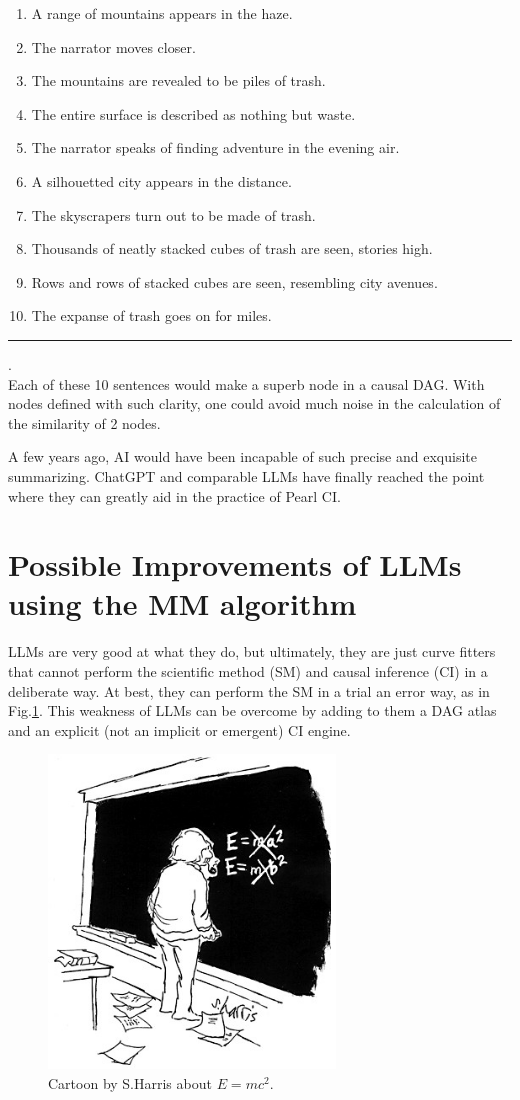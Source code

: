 \documentclass[12pt]{article}
\begin{document}
\begin{enumerate}
\item A range of mountains appears in the haze.
\item The narrator moves closer.
\item The mountains are revealed to be piles of trash.
\item The entire surface is described as nothing but waste.
\item The narrator speaks of finding adventure in the evening air.
\item A silhouetted city appears in the distance.
\item The skyscrapers turn out to be made of trash.
\item Thousands of neatly stacked cubes of trash are seen, stories high.
\item Rows and rows of stacked cubes are seen, resembling city avenues.
\item The expanse of trash goes on for miles.
\end{enumerate}
\hrule
.\\
Each of these 10 sentences would make
a superb node in a causal DAG. With nodes defined
with such clarity, 
one could avoid much noise in the calculation of the similarity
of 2 nodes.

A few years ago, AI would have been
incapable of such precise and exquisite summarizing.
ChatGPT and 
comparable LLMs 
have finally reached the point where they 
can greatly aid
in the practice of Pearl CI.


\section{Possible Improvements
of LLMs 
using the MM algorithm}
 
LLMs
are very good at what they do,
but ultimately, they are just curve fitters
that cannot perform the scientific method (SM)
and causal inference (CI)
in a deliberate way. At best, they can 
perform the SM in a trial an error way, as in 
Fig.\ref{fig-harris-e-mc2}.
This weakness of LLMs can be overcome
by adding to them
a DAG atlas and an explicit (not an implicit or emergent) CI engine.


\begin{figure}[h!]
\centering
\includegraphics[width=3in]
{harris-e-mc2.jpg}
\caption{Cartoon 
by S.Harris
about $E=mc^2$.
}
\label{fig-harris-e-mc2}
\end{figure}




\end{document}

